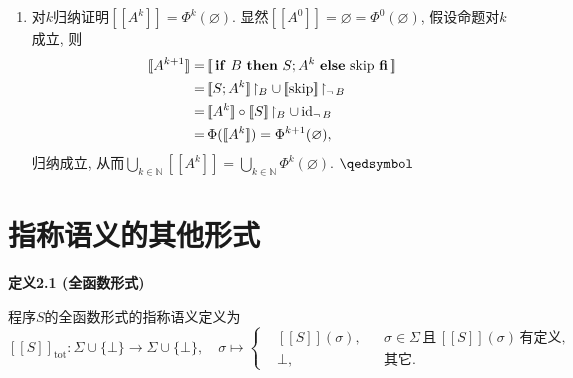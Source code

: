 \documentclass[UTF8]{ctexart}
\begin{document}
\begin{enumerate}
    \hspace{2.17em}
    如果$\sigma\not\models B$, 则$\tau=\sigma=[\![W]\!](\sigma)$.
    所以始终有$[\![A^{k+1}]\!]\subset[\![W]\!]$.

    \vspace{3pt}\hspace{2.17em}
    归纳成立, 从而$\displaystyle\bigcup_{k\in\mathbb{N}}[\![A^k]\!]
    \subset[\![W]\!]$. 综上可得二者相等.

    \vspace{5pt}
    \item 对$k$归纳证明$[\![A^k]\!]=\Phi^k(\varnothing)$.
    显然$[\![A^0]\!]=\varnothing=\Phi^0(\varnothing)$, 假设命题对$k$成立, 则
    \vspace{3pt}
    \[\begin{aligned}\relax
        [\![A^{k+1}]\!]=\,&[\![\,\mathbf{if}\,\,B\,\,\mathbf{then}\,\,
        S;A^k\,\,\mathbf{else}\,\,\mathrm{skip}\,\,\mathbf{fi}\,]\!]\\
        =\,&[\![S;A^k]\!]\!\restriction_B\cup\,
        [\![\mathrm{skip}]\!]\!\restriction_{\neg\,B}\\
        =\,&[\![A^k]\!]\circ[\![S]\!]\!\restriction_B\cup\,
        \mathrm{id}_{\neg\,B}\\
        =\,&\Phi([\![A^k]\!])=\Phi^{k+1}(\varnothing),
    \end{aligned}\]
    归纳成立, 从而$\displaystyle\bigcup_{k\in\mathbb{N}}[\![A^k]\!]=
    \bigcup_{k\in\mathbb{N}}\Phi^k(\varnothing)$. \hfill $\qedsymbol$
\end{enumerate}





\newpage

\section{指称语义的其他形式}

\hypertarget{sec:定义2.1}{}
\noindent\textbf{定义2.1 (全函数形式)}

程序$S$的全函数形式的指称语义定义为
\[
    [\![S]\!]_{\mathrm{tot}}:\Sigma\cup\{\bot\}\to\Sigma\cup\{\bot\},\quad
    \sigma\mapsto\left\{\begin{aligned}
        &[\![S]\!](\sigma),&&\sigma\in\Sigma
        \,\text{且}\,[\![S]\!](\sigma)\,\text{有定义},\\
        &\bot,&&\text{其它}.
    \end{aligned}\right.
\]

\vspace{10pt}
\end{document}
